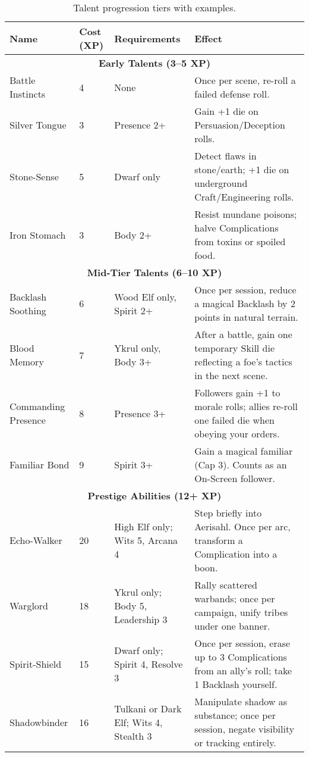 \documentclass[12pt]{article}
\begin{document}
\begin{table}[h]
\centering
\renewcommand{\arraystretch}{1.3}
\begin{tabular}{|p{3cm}|p{2cm}|p{3cm}|p{6cm}|}
\hline
\textbf{Name} & \textbf{Cost (XP)} & \textbf{Requirements} & \textbf{Effect} \\
\hline
\multicolumn{4}{|c|}{\textbf{Early Talents (3–5 XP)}} \\
\hline
Battle Instincts & 4 & None & Once per scene, re-roll a failed defense roll. \\
Silver Tongue & 3 & Presence 2+ & Gain +1 die on Persuasion/Deception rolls. \\
Stone-Sense & 5 & Dwarf only & Detect flaws in stone/earth; +1 die on underground Craft/Engineering rolls. \\
Iron Stomach & 3 & Body 2+ & Resist mundane poisons; halve Complications from toxins or spoiled food. \\
\hline
\multicolumn{4}{|c|}{\textbf{Mid-Tier Talents (6–10 XP)}} \\
\hline
Backlash Soothing & 6 & Wood Elf only, Spirit 2+ & Once per session, reduce a magical Backlash by 2 points in natural terrain. \\
Blood Memory & 7 & Ykrul only, Body 3+ & After a battle, gain one temporary Skill die reflecting a foe’s tactics in the next scene. \\
Commanding Presence & 8 & Presence 3+ & Followers gain +1 to morale rolls; allies re-roll one failed die when obeying your orders. \\
Familiar Bond & 9 & Spirit 3+ & Gain a magical familiar (Cap 3). Counts as an On-Screen follower. \\
\hline
\multicolumn{4}{|c|}{\textbf{Prestige Abilities (12+ XP)}} \\
\hline
Echo-Walker & 20 & High Elf only; Wits 5, Arcana 4 & Step briefly into Aerisahl. Once per arc, transform a Complication into a boon. \\
Warglord & 18 & Ykrul only; Body 5, Leadership 3 & Rally scattered warbands; once per campaign, unify tribes under one banner. \\
Spirit-Shield & 15 & Dwarf only; Spirit 4, Resolve 3 & Once per session, erase up to 3 Complications from an ally’s roll; take 1 Backlash yourself. \\
Shadowbinder & 16 & Tulkani or Dark Elf; Wits 4, Stealth 3 & Manipulate shadow as substance; once per session, negate visibility or tracking entirely. \\
\hline
\end{tabular}
\caption{Talent progression tiers with examples.}
\end{table}
\end{document}
